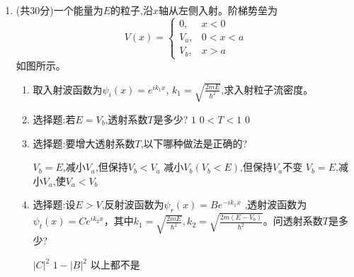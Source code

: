 \begin{enumerate}
{\begin{enumerate}
			\item 基态概率和第一激发态概率为
			\[
				\boxed{P_1=|c_1|^2=\frac{960}{\pi^6}},
				\qquad
				\boxed{P_2=|c_2|^2=0}.
			\]
			它们均不随时间变化。

			\item 初态关于势阱中心 $x=a/2$ 对称；展开中只有关于该中心为偶宇称的奇数编号本征态，时间演化不破坏此宇称。因此任意时刻的概率密度均满足
			$|\Psi(a-x,t)|^2=|\Psi(x,t)|^2$，从而
			\[
				\boxed{\langle x\rangle_t=\frac a2}.
			\]
		\end{enumerate}
	}


	\item
(共$ 30 $分)一个能量为$ E $的粒子,沿$ x $轴从左侧入射。阶梯势垒为
$$
V(x)=\left\{\begin{array}{ll}
	0, & x<0 \\
	V_{a}, & 0<x<a \\
	V_{b}, & x>a
\end{array}\right.
$$
如图所示。
\begin{figure}[h!]
	\centering
	
\end{figure}
\begin{enumerate}
	\item
	取入射波函数为$\psi_{i}(x)=e^{i k_{1} x}$,  $k_{1}=\sqrt{\frac{2 m E}{\hbar^{2}}}$,求入射粒子流密度。
	
	\item 
	选择题:若$ E=V_{b} $,透射系数$ T $是多少?
\threechoices
{$1$}
{$0<T<1$}
{$0 $}

\item 
选择题:要增大透射系数$ T $,以下哪种做法是正确的?


\threechoices
{$ V_{b} =E $,减小$ V_{a} $,但保持$ V_{b}<V_{a} $}
{减小$ V_{b}( V_{b} <E) $,但保持$ V_{a} $不变}
{$ V_{b} =E $,减小$ V_{a} $,使$ V_{a}< V_{b} $}


\item 
选择题:设$ E>V $,反射波函数为$\psi_{r}(x)=B e^{-i k_{1} x}$ ,透射波函数为$\psi_{t}(x)=C e^{i k_{2} x}$，其中$k_{1}=\sqrt{\frac{2 m E}{\hbar^{2}}},  k_{2}=\sqrt{\frac{2 m\left(E-V_{b}\right)}{\hbar^{2}}}$。问透射系数$ T $是多少?

\threechoices
{$ |C|^{2} $}
{$1-|B|^{2}$}
{以上都不是}






\end{enumerate}
\end{enumerate}
